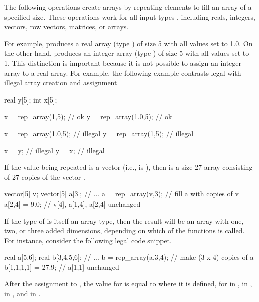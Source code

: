 The following operations create arrays by repeating elements to fill
an array of a specified size.  These operations work for all input
types , including reals, integers, vectors, row vectors,
matrices, or arrays.
%
\begin{description}
%
%
\end{description}
%
For example,  produces a real array (type
) of size 5 with all values set to 1.0.  On the other
hand,  produces an integer array (type
) of size 5 with all values set to 1.  This distinction is
important because it is not possible to assign an integer array to a
real array.  For example, the following example contrasts legal with
illegal array creation and assignment
%
\begin{stancode}
real y[5];
int x[5];

x = rep_array(1,5);     // ok
y = rep_array(1.0,5);   // ok

x = rep_array(1.0,5);   // illegal 
y = rep_array(1,5);     // illegal

x = y;                  // illegal
y = x;                  // illegal
\end{stancode}

If the value being repeated  is a vector (i.e.,  is
), then  is a size 27 array
consisting of 27 copies of the vector .
%
\begin{stancode}
vector[5] v;
vector[5] a[3];
// ...
a = rep_array(v,3);  // fill a with copies of v
a[2,4] = 9.0;        // v[4], a[1,4], a[2,4] unchanged
\end{stancode}

If the type  of  is itself an array type, then the
result will be an array with one, two, or three added dimensions,
depending on which of the  functions is called.  For
instance, consider the following legal code snippet.
%
\begin{stancode}
real a[5,6];
real b[3,4,5,6];
// ...
b = rep_array(a,3,4); //  make (3 x 4) copies of a
b[1,1,1,1] = 27.9;    //  a[1,1] unchanged
\end{stancode}
%
After the assignment to , the value for  is
equal to  where it is defined, for  in ,
 in ,  in , and  in
.

